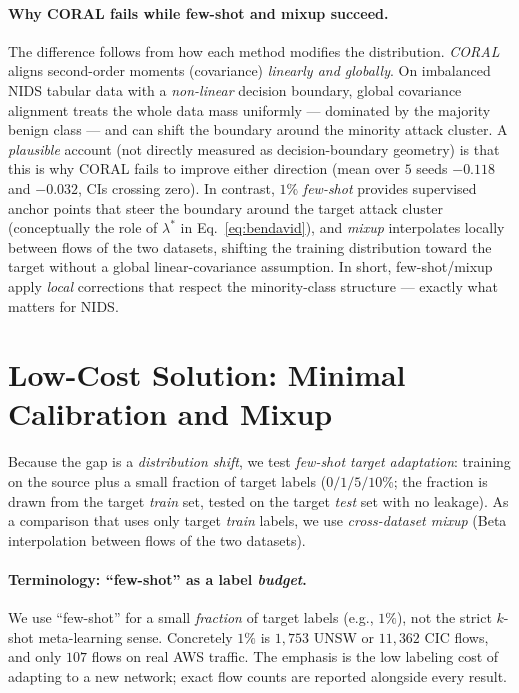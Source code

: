 \documentclass[preprint,12pt,authoryear]{elsarticle}
\begin{document}
\paragraph{Why CORAL fails while few-shot and mixup succeed.} The difference
follows from how each method modifies the distribution. \emph{CORAL} aligns
second-order moments (covariance) \emph{linearly and globally}. On imbalanced NIDS
tabular data with a \emph{non-linear} decision boundary, global covariance
alignment treats the whole data mass uniformly --- dominated by the majority benign
class --- and can shift the boundary around the minority attack cluster. A
\emph{plausible} account (not directly measured as decision-boundary geometry) is
that this is why CORAL fails to improve either direction (mean over $5$ seeds
$-0.118$ and $-0.032$, CIs crossing zero). In contrast, $1\%$ \emph{few-shot}
provides supervised anchor points that steer the boundary around the target attack
cluster (conceptually the role of $\lambda^\ast$ in Eq.~\eqref{eq:bendavid}), and
\emph{mixup} interpolates locally between flows of the two datasets, shifting the
training distribution toward the target without a global linear-covariance
assumption. In short, few-shot/mixup apply \emph{local} corrections that respect the
minority-class structure --- exactly what matters for NIDS.

\FloatBarrier

\section{Low-Cost Solution: Minimal Calibration and Mixup}
\label{sec:da}

Because the gap is a \emph{distribution shift}, we test \emph{few-shot target
adaptation}: training on the source plus a small fraction of target labels
($0/1/5/10\%$; the fraction is drawn from the target \emph{train} set, tested on
the target \emph{test} set with no leakage). As a comparison that uses only target
\emph{train} labels, we use \emph{cross-dataset mixup} (Beta interpolation between
flows of the two datasets).

\paragraph{Terminology: ``few-shot'' as a label \emph{budget}.} We use ``few-shot''
for a small \emph{fraction} of target labels (e.g., $1\%$), not the strict $k$-shot
meta-learning sense. Concretely $1\%$ is $1{,}753$ UNSW or $11{,}362$ CIC flows, and
only $107$ flows on real AWS traffic. The emphasis is the low labeling cost of
adapting to a new network; exact flow counts are reported alongside every result.
\end{document}

